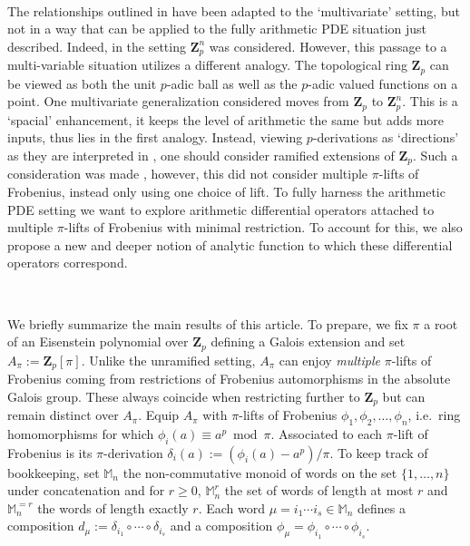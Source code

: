 \documentclass[10pt]{amsart}
\theoremstyle{Theorem}
\theoremstyle{definition}
\newcommand{\ZZ}{\mathbf Z}
\renewcommand{\d}{\delta}
\begin{document}
\


The relationships outlined in \cite{BRS11} have been adapted to the `multivariate' setting, but not in a way that can be applied to the fully arithmetic PDE situation just described. Indeed, in \cite{Bra20} the setting $\ZZ_p^n$ was considered. However, this passage to a multi-variable situation utilizes a different analogy. The topological ring $\ZZ_p$ can be viewed as both the unit $p$-adic ball as well as the $p$-adic valued functions on a point. One multivariate generalization considered moves from $\ZZ_p$ to $\ZZ_p^n$. This is a `spacial' enhancement, it keeps the level of arithmetic the same but adds more inputs, thus lies in the first analogy. Instead, viewing $p$-derivations as `directions' as they are interpreted in \cite{BM26}, one should consider ramified extensions of $\ZZ_p$. Such a consideration was made \cite{Lam23}, however, this did not consider multiple $\pi$-lifts of Frobenius, instead only using one choice of lift. To fully harness the arithmetic PDE setting we want to explore arithmetic differential operators attached to multiple $\pi$-lifts of Frobenius with minimal restriction. To account for this, we also propose a new and deeper notion of analytic function to which these differential operators correspond. 


\

We briefly summarize the main results of this article. To prepare, we fix $\pi$ a root of an Eisenstein polynomial over $\ZZ_p$ defining a Galois extension and set $A_\pi := \ZZ_p[\pi]$. Unlike the unramified setting, $A_\pi$ can enjoy {\it multiple} $\pi$-lifts of Frobenius coming from restrictions of Frobenius automorphisms in the absolute Galois group. These always coincide when restricting further to $\ZZ_p$ but can remain distinct over $A_\pi$. Equip $A_\pi$ with $\pi$-lifts of Frobenius $\phi_1,\phi_2,\ldots,\phi_n$, i.e.\ ring homomorphisms for which $\phi_i(a) \equiv a^p \bmod \pi$. 
Associated to each $\pi$-lift of Frobenius is its $\pi$-derivation $\delta_i(a) := (\phi_i(a) - a^p)/\pi$. To keep track of bookkeeping, set $\mathbb M_n$ the non-commutative monoid of words on the set $\{ 1,\ldots,n\}$ under concatenation and for $r \geq 0$, $\mathbb M_n^r$ the set of words of length at most $r$ and $\mathbb M_n^{=r}$ the words of length exactly $r$. Each word $\mu = i_1 \cdots i_s \in \mathbb M_n$ defines a composition $d_\mu := \d_{i_1} \circ \cdots \circ \d_{i_s}$ and a composition $\phi_\mu = \phi_{i_1} \circ \cdots \circ \phi_{i_s}$. 

\
\end{document}

